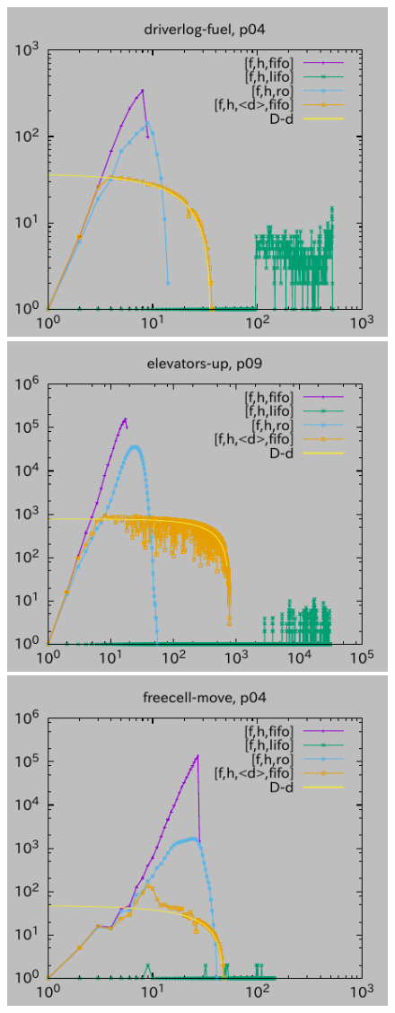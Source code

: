 \begin{figure}[htbp]
\includegraphics{img/depth/driverlog-fuel/p04.pdf}
\includegraphics{img/depth/elevators-up/p09.pdf}
\includegraphics{img/depth/freecell-move/p04.pdf}

\end{figure}
